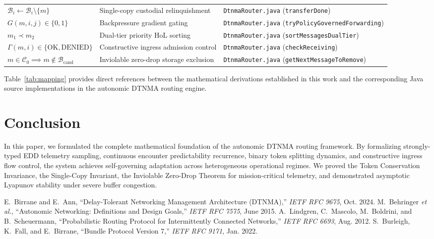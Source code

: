 \documentclass[journal,compsoc]{IEEEtran}
\begin{document}
\begin{table}[t]
\begin{tabular}{lll}
$\mathcal{B}_i \leftarrow \mathcal{B}_i \setminus \{m\}$ & Single-copy custodial relinquishment & \texttt{DtnmaRouter.java} (\texttt{transferDone}) \\
$G(m, i, j) \in \{0, 1\}$ & Backpressure gradient gating & \texttt{DtnmaRouter.java} (\texttt{tryPolicyGovernedForwarding}) \\
$m_1 \prec m_2$ & Dual-tier priority HoL sorting & \texttt{DtnmaRouter.java} (\texttt{sortMessagesDualTier}) \\
$\Gamma(m, i) \in \{\mathrm{OK}, \mathrm{DENIED}\}$ & Constructive ingress admission control & \texttt{DtnmaRouter.java} (\texttt{checkReceiving}) \\
$m \in \mathcal{C}_0 \implies m \notin \mathcal{B}_{\mathrm{cand}}$ & Inviolable zero-drop storage exclusion & \texttt{DtnmaRouter.java} (\texttt{getNextMessageToRemove}) \\
\bottomrule
\end{tabular}
\end{table}

Table~\ref{tab:mapping} provides direct references between the mathematical derivations established in this work and the corresponding Java source implementations in the autonomic DTNMA routing engine.

\section{Conclusion}

In this paper, we formulated the complete mathematical foundation of the autonomic DTNMA routing framework. By formalizing strongly-typed EDD telemetry sampling, continuous encounter predictability recurrence, binary token splitting dynamics, and constructive ingress flow control, the system achieves self-governing adaptation across heterogeneous operational regimes. We proved the Token Conservation Invariance, the Single-Copy Invariant, the Inviolable Zero-Drop Theorem for mission-critical telemetry, and demonstrated asymptotic Lyapunov stability under severe buffer congestion.


\begin{thebibliography}{99}
E.~Birrane and E.~Ann, ``Delay-Tolerant Networking Management Architecture (DTNMA),'' \emph{IETF RFC 9675}, Oct. 2024.
M.~Behringer \emph{et al.}, ``Autonomic Networking: Definitions and Design Goals,'' \emph{IETF RFC 7575}, June 2015.
A.~Lindgren, C.~Mascolo, M.~Boldrini, and B.~Scheuermann, ``Probabilistic Routing Protocol for Intermittently Connected Networks,'' \emph{IETF RFC 6693}, Aug. 2012.
S.~Burleigh, K.~Fall, and E.~Birrane, ``Bundle Protocol Version 7,'' \emph{IETF RFC 9171}, Jan. 2022.
\end{thebibliography}
\end{document}
